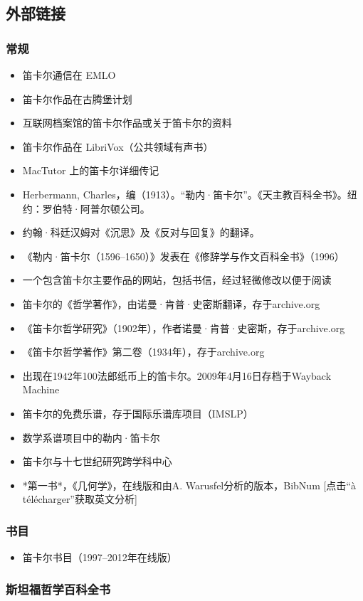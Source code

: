 \subsection{外部链接}
\subsubsection{常规}
\begin{itemize}
\item 笛卡尔通信在 EMLO
\item 笛卡尔作品在古腾堡计划
\item 互联网档案馆的笛卡尔作品或关于笛卡尔的资料
\item 笛卡尔作品在 LibriVox（公共领域有声书）
\item MacTutor 上的笛卡尔详细传记
\item Herbermann, Charles，编（1913）。“勒内·笛卡尔”。《天主教百科全书》。纽约：罗伯特·阿普尔顿公司。
\item 约翰·科廷汉姆对《沉思》及《反对与回复》的翻译。
\item 《勒内·笛卡尔（1596–1650）》发表在《修辞学与作文百科全书》（1996）
\item 一个包含笛卡尔主要作品的网站，包括书信，经过轻微修改以便于阅读
\item 笛卡尔的《哲学著作》，由诺曼·肯普·史密斯翻译，存于archive.org
\item 《笛卡尔哲学研究》（1902年），作者诺曼·肯普·史密斯，存于archive.org
\item 《笛卡尔哲学著作》第二卷（1934年），存于archive.org
\item 出现在1942年100法郎纸币上的笛卡尔。2009年4月16日存档于Wayback Machine
\item 笛卡尔的免费乐谱，存于国际乐谱库项目（IMSLP）
\item 数学系谱项目中的勒内·笛卡尔
\item 笛卡尔与十七世纪研究跨学科中心
\item *第一书*，《几何学》，在线版和由A. Warusfel分析的版本，BibNum [点击“à télécharger”获取英文分析]
\end{itemize}
\subsubsection{书目}
\begin{itemize}
\item 笛卡尔书目（1997–2012年在线版）
\end{itemize}
\subsubsection{斯坦福哲学百科全书}

